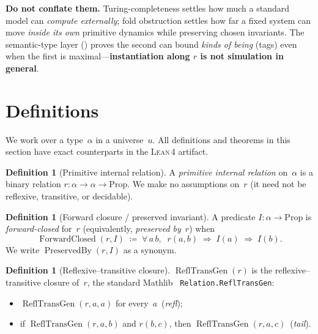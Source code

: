 \documentclass[11pt]{article}
\theoremstyle{plain}
\theoremstyle{definition}
\newtheorem{definition}[theorem]{Definition}
\theoremstyle{remark}
\newcommand{\Lean}{\textsc{Lean\,4}}
\newcommand{\ReflTransGen}{\operatorname{ReflTransGen}}
\newcommand{\PreservedBy}{\operatorname{PreservedBy}}
\newcommand{\ForwardClosed}{\operatorname{ForwardClosed}}
\begin{document}
\begin{keybox}[title={Computational vs.\ architectural ceilings}]
\textbf{Do not conflate them.}  Turing-completeness settles how much a standard model can
\emph{compute externally}; fold obstruction settles how far a fixed system can move
\emph{inside its own} primitive dynamics while preserving chosen invariants.  The
semantic-type layer () proves the second can bound \emph{kinds of
being} (tags) even when the first is maximal---\textbf{instantiation along $r$ is not
simulation in general}.
\end{keybox}

\section{Definitions}\label{sec:defs}

We work over a type~$\alpha$ in a universe~$u$.  All definitions and theorems in this
section have exact counterparts in the \Lean{} artifact.

\begin{definition}[Primitive internal relation]\label{def:relation}
A \emph{primitive internal relation} on~$\alpha$ is a binary relation
$r : \alpha \to \alpha \to \mathrm{Prop}$.  We make no assumptions on~$r$ (it need
not be reflexive, transitive, or decidable).
\end{definition}

\begin{definition}[Forward closure / preserved invariant]\label{def:forwardclosed}
A predicate $I : \alpha \to \mathrm{Prop}$ is \emph{forward-closed} for~$r$
(equivalently, \emph{preserved by}~$r$) when
\[
  \ForwardClosed(r,I) \;\coloneqq\;
  \forall\, a\, b,\;\; r(a,b) \;\Longrightarrow\; I(a) \;\Longrightarrow\; I(b).
\]
We write $\PreservedBy(r,I)$ as a synonym.
\end{definition}

\begin{definition}[Reflexive--transitive closure]\label{def:refltransgen}
$\ReflTransGen(r)$ is the reflexive--transitive closure of~$r$, the standard
Mathlib~\cite{mathlib} \texttt{Relation.ReflTransGen}:
\begin{itemize}[nosep]
  \item $\ReflTransGen(r,a,a)$ for every~$a$ \,(\emph{refl});
  \item if $\ReflTransGen(r,a,b)$ and $r(b,c)$, then $\ReflTransGen(r,a,c)$
    \,(\emph{tail}).
\end{itemize}
\end{definition}
\end{document}
